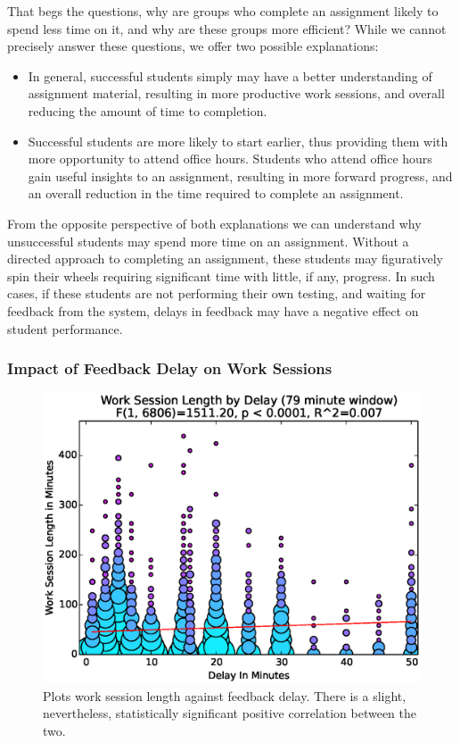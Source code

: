 That begs the questions, why are groups who complete an assignment likely to
spend less time on it, and why are these groups more efficient? While we cannot
precisely answer these questions, we offer two possible explanations:

\begin{itemize}
\item In general, successful students simply may have a better understanding of
  assignment material, resulting in more productive work sessions, and overall
  reducing the amount of time to completion.
\item Successful students are more likely to start earlier, thus providing them
  with more opportunity to attend office hours. Students who attend office
  hours gain useful insights to an assignment, resulting in more forward
  progress, and an overall reduction in the time required to complete an
  assignment.
\end{itemize}

From the opposite perspective of both explanations we can understand why
unsuccessful students may spend more time on an assignment. Without a directed
approach to completing an assignment, these students may figuratively spin
their wheels requiring significant time with little, if any, progress. In such
cases, if these students are not performing their own testing, and waiting for
feedback from the system, delays in feedback may have a negative effect on
student performance.


\subsubsection{Impact of Feedback Delay on Work Sessions}

\begin{figure}[!t]
\centering
\includegraphics[width=5.25in]{graphs/Work_Session_Length_by_Delay_(79_minute_window).eps}
\caption{Plots work session length against feedback delay. There is a slight,
  nevertheless, statistically significant positive correlation between the
  two.}
\end{figure}

